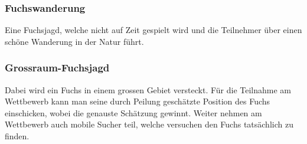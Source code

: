 \subsubsection{Fuchswanderung} %
\label{ssub:Fuchswanderung}
Eine Fuchsjagd, welche nicht auf Zeit gespielt wird und die Teilnehmer über einen schöne Wanderung in der Natur führt.

\subsubsection{Grossraum-Fuchsjagd} %
\label{ssub:Grossraum-Fuchsjagd}
Dabei wird ein Fuchs in einem grossen Gebiet versteckt. Für die Teilnahme am Wettbewerb kann man seine durch Peilung geschätzte Position des Fuchs einschicken, wobei die genauste Schätzung gewinnt. Weiter nehmen am Wettbewerb auch mobile Sucher teil, welche versuchen den Fuchs tatsächlich zu finden.

